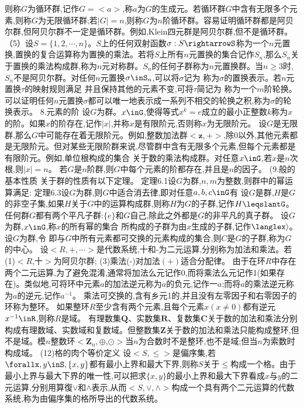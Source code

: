 则称$G$为循环群,记作$G=<a>$,称$a$为$G$的生成元。若循环群$G$中含有无限多个元素,则称$G$为无限循环群;若$|G|=n$,则称$G$为$n$阶循环群。容易证明循环群都是阿贝尔群,但阿贝尔群不一定是循环群。例如,Klein四元群是阿贝尔群,但不是循环群。
（5）设$S=\{1,2,\cdots,n\}。S$上的任何双射函数$\sigma:S\rightarrowS$称为一个$n$元置换,置换的复合运算称为置换的乘法。若将$S$上所有$n$元置换的集合记作$S_{n}$,那么$S_{n}$关于置换的乘法构成群,称为$n$元对称群。$S_{n}$的任何子群称为$n$元置换群。当$n\geqslant3$时,$S_{n}$不是阿贝尔群。对任何$n$元置换$\sigma\inS_{n}$,可以将$\sigma$记为
称为$\sigma$的置换表示。若$n$元置换$\tau$的映射规则满足
并且保持其他的元素不变,可将$\tau$简记为
称为一个$m$阶轮换。可以证明任何$n$元置换$\sigma$都可以唯一地表示成一系列不相交的轮换之积,称为$\sigma$的轮换表示。
{8.元素的阶}
设$G$为群。$x\inG$,使得等式$x^{k}=e$成立的最小正整数$k$称为$x$的阶。如果$x$的阶存在,记作$|x|$,并称$x$是有限阶元,否则称$x$为无限阶元。
设$G$是无限群,那么$G$中可能存在着无限阶元。例如,整数加法群$<\mathbf{z},+>$,除0以外,其他元素都是无限阶元。但对某些无限阶群来说,尽管群中含有无限多个元素,但每个元素都是有限阶元。例如,单位根构成的集合
关于数的乘法构成群。对任意$x\inG$,若$x$是$n$次根,则$|x|=n$。
若$G$是$n$阶群,则$G$中每个元素的阶都存在,并且是$n$的因子。
{(9.般的基本性质}
关于群的性质有以下定理。
定理6.1设$G$为群,$n,m$为整数,则群中的幂运算满足:
定理6.3设$G$为群,则$G$中适合消去律,即对任意$a,b,c\inG$有
设$G$是群,$H$是$G$的非空子集,如果$H$关于$G$中的运算构成群,则称$H$为$G$的子群,记作$H\leqslantG$。任何群$G$都有两个平凡子群:$\{e\}$和$G$自己,除此之外都是$G$的非平凡的真子群。
设$G$为群,$x\inG$,称$x$的所有幂的集合
所构成的子群为由$x$生成的子群,记作$\langlex\rangle$。
设$G$为群,令
即与$G$中所有元素都可交换的元素构成的集合,则$C$是$G$的子群,称为$G$的中心。
设$<R,+,\cdots>$是代数系统,十和-为二元运算,分别称为加法和乘法。若
(1)$<R$,十$>$为阿贝尔群;
(3)乘法(-)对加法$(+)$适合分配律。
由于在环$R$中存在两个二元运算,为了避免混淆,通常将加法么元记作0,而将乘法么元记作1(如果存在)。类似地,可将环中元素$a$的加法逆元称为$a$的负元,记作一$a$;而将$a$的乘法逆元称为$a$的逆元,记作$a^{-1}$。
乘法可交换的,含有乡元1的,并且没有左零因子和右零因子的环称为整环。
如果整环$R$至少含有两个元素,且每个元素$x(x\neq0)$都有逆元$x^{-1}\inR$,则称$R$是域。
有理数集$\mathbf{Q}$、实数集$\mathbf{R}$、复数集$\mathbf{C}$关于数的加法和乘法分别构成有理数域、实数域和复数域。但整数集$\mathbf{Z}$关于数的加法和乘法只能构成整环,但不是域。模$n$整数环$<\mathbf{Z}_{n},\oplus$,$\odot>$当$n$为合数时不是整环,也不是域;但当$n$为索数时构成域。
(12)格的肉个等价定义
设$<S,\leqslant>$是偏序集,若$\forallx,y\inS,\{x,y\}$都有最小上界和最大下界,则称$S$关于$\leqslant$构成一个格。由于最小上界与最大下界的唯一性,可以把求$\{x,y\}$的最小上界和最大下界看成$x$与$y$的二元运算,分别用算復$\vee$和$\wedge$表示,从而$<S,\vee,\wedge>$构成一个具有两个二元运算的代数系统,称为由偏序集的格所导出的代数系统。
